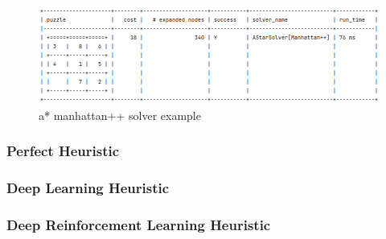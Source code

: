\begin{figure}[H]
\centering
\includegraphics[scale=0.39]{./Figures/exampleastarmanhattanplussolver}
\caption[Examples]{a* manhattan++ solver example}
\label{fig:exampleastarmanhattanplussolver}
\end{figure}



\subsubsection{Perfect Heuristic}
\subsubsection{Deep Learning Heuristic}
\subsubsection{Deep Reinforcement Learning Heuristic}


